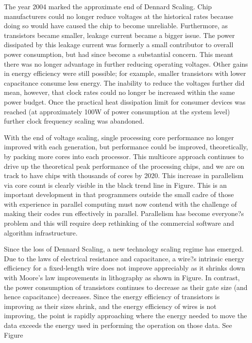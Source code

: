 The year 2004 marked the approximate end of Dennard Scaling. Chip manufacturers could no longer reduce voltages at the historical rates because doing so would have caused the chip to become unreliable. Furthermore, as transistors became smaller, leakage current became a bigger issue. The power dissipated by this leakage current was formerly a small contributor to overall power consumption, but had since become a substantial concern. This meant there was no longer advantage in further reducing operating voltages. Other gains in energy efficiency were still possible; for example, smaller transistors with lower capacitance consume less energy. The inability to reduce the voltages further did mean, however, that clock rates could no longer be increased within the same power budget. Once the practical heat dissipation limit for consumer devices was reached (at approximately 100W of power consumption at the system level) further clock frequency scaling was abandoned.  %

With the end of voltage scaling, single processing core performance no longer improved with each generation, but performance could be improved, theoretically, by packing more cores into each processor. This multicore approach continues to drive up the theoretical peak performance of the processing chips, and we are on track to have chips with thousands of cores by 2020.  This increase in parallelism via core count is clearly visible in the black trend line in Figure.  This is an important development in that programmers outside the small cadre of those with experience in parallel computing must now contend with the challenge of making their codes run effectively in parallel. Parallelism has become everyone?s problem and this will require deep rethinking of the commercial software and algorithm infrastructure. 

Since the loss of Dennard Scaling, a new technology scaling regime has emerged. Due to the laws of electrical resistance and capacitance, a wire?s intrinsic energy efficiency for a fixed-length wire does not improve appreciably as it shrinks down with Moore's law improvements in lithography as shown in Figure. In contrast, the power consumption of transistors continues to decrease as their gate size (and hence capacitance) decreases. Since the energy efficiency of transistors is improving as their sizes shrink, and the energy efficiency of wires is not improving, the point is rapidly approaching where the energy needed to move the data exceeds the energy used in performing the operation on those data.  See Figure

